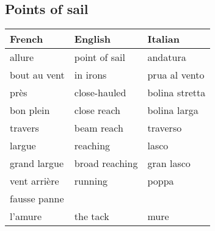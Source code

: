 \documentclass[a4paper, 12pt, twoside]{article}
\begin{document}
    \begin{indt}{\section{Points of sail}} %
        \begin{tabular}{|l|l|l|}
            \hline %
            \textbf{French}
            & \textbf{English}
            & \textbf{Italian}
            \\
            \hline
            \hline %
            allure %
            & point of sail
            & andatura
            \\
            \hline %
            bout au vent %
            & in irons
            & prua al vento
            \\
            \hline %
            près %
            & close-hauled
            & bolina stretta
            \\
            \hline %
            bon plein %
            & close reach
            & bolina larga
            \\
            \hline %
            travers %
            & beam reach
            & traverso
            \\
            \hline %
            largue %
            & reaching
            & lasco
            \\
            \hline %
            grand largue %
            & broad reaching
            & gran lasco
            \\
            \hline %
            vent arrière %
            & running
            & poppa
            \\
            \hline %
            fausse panne %
            &
            &
            \\
            \hline %
            l'amure %
            & the tack
            & mure
            \\
            \hline %
        \end{tabular}
    \end{indt} %
\end{document}
